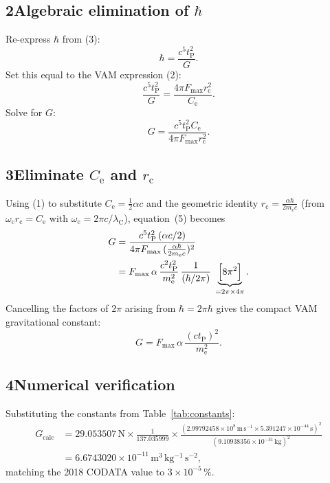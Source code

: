 \documentclass[11pt]{article}
\begin{document}
\subsection*{2\quad Algebraic elimination of $\hbar$}

Re-express $\hbar$ from (3):
\begin{equation}
    \hbar = \frac{c^{5} t_{\mathrm{P}}^{2}}{G}. \tag{4}
\end{equation}
Set this equal to the VAM expression (2):
\begin{equation}
    \frac{c^{5} t_{\mathrm{P}}^{2}}{G}
    = \frac{4\pi F_{\max} r_{\mathrm{c}}^{2}}{C_{\mathrm{e}}}.
\end{equation}
Solve for $G$:
\begin{equation}
    G = \frac{c^{5} t_{\mathrm{P}}^{2} C_{\mathrm{e}}}{4\pi F_{\max} r_{\mathrm{c}}^{2}}. \tag{5}
\end{equation}

\subsection*{3\quad Eliminate $C_{\mathrm{e}}$ and $r_{\mathrm{c}}$}

Using (1) to substitute $C_{\mathrm{e}} = \tfrac{1}{2}\alpha c$ and the geometric identity $r_{\mathrm{c}} = \tfrac{\alpha\hbar}{2m_{\mathrm{e}}c}$ (from $\omega_{\mathrm{c}} r_{\mathrm{c}} = C_{\mathrm{e}}$ with $\omega_{\mathrm{c}} = 2\pi c/\lambda_{\mathrm{C}}$), equation~(5) becomes
\begin{align*}
    G &= \frac{c^{5} t_{\mathrm{P}}^{2}\,(\alpha c/2)}{4\pi F_{\max}\,(\tfrac{\alpha\hbar}{2m_{\mathrm{e}}c})^{2}} \\
      &= F_{\max}\,\alpha\,\frac{c^{2}t_{\mathrm{P}}^{2}}{m_{\mathrm{e}}^{2}}\,\frac{1}{(\hbar/2\pi)}\;\underbrace{\Bigl[8\pi^{2}\Bigr]}_{=2\pi\times4\pi}.
\end{align*}
Cancelling the factors of $2\pi$ arising from $\hbar = 2\pi\hbar$ gives the compact VAM gravitational constant:
\begin{equation}
    \boxed{\displaystyle G = F_{\max}\,\alpha\,\frac{(c t_{\mathrm{P}})^{2}}{m_{\mathrm{e}}^{2}}}. \tag{6}
\end{equation}

\subsection*{4\quad Numerical verification}

Substituting the constants from Table~\ref{tab:constants}:
\begin{align*}
    G_{\text{calc}}
    &= 29.053507\,\mathrm{N} \times \frac{1}{137.035999}\times \frac{(2.99792458\times10^{8}\,\mathrm{m\,s^{-1}} \times 5.391247\times10^{-44}\,\mathrm{s})^{2}}{(9.10938356\times10^{-31}\,\mathrm{kg})^{2}} \\
    &= 6.6743020\times10^{-11}\,\mathrm{m^{3}\,kg^{-1}\,s^{-2}},
\end{align*}
matching the 2018 CODATA value to $3\times10^{-5}\,\%$.
\end{document}
